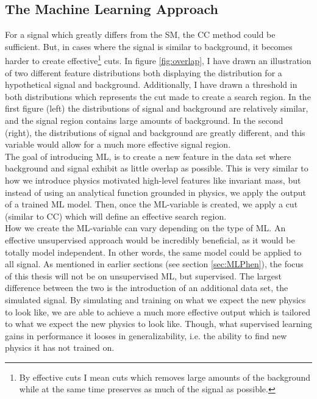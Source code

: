 \subsection{The Machine Learning Approach}
For a signal which greatly differs from the \ac{SM}, the \ac{CC} method could be sufficient. But, in 
cases where the signal is similar to background, it becomes harder to create effective\footnote{By effective
cuts I mean cuts which removes large amounts of the background while at the same time preserves as much of 
the signal as possible.} cuts. In figure \ref{fig:overlap}, I have drawn an illustration of two different feature distributions both 
displaying the distribution for a hypothetical signal and background. Additionally, I have drawn a 
threshold in both distributions which represents the cut made to create a search region. In the first 
figure (left) the distributions of signal and background are relatively similar, and the signal region 
contains large amounts of background. In the second (right), the distributions of signal and background 
are greatly different, and this variable would allow for a much more effective signal region. 
\\
The goal of introducing \ac{ML}, is to create a new feature in the data set where background and signal
exhibit as little overlap as possible. This is very similar to how we introduce physics motivated high-level
features like invariant mass, but instead of using an analytical function grounded in physics, 
we apply the output of a trained \ac{ML} model. Then, once the \ac{ML}-variable is created, 
we apply a cut (similar to \ac{CC}) which will define an effective search region. 
\\
How we create the \ac{ML}-variable can vary depending on the type of \ac{ML}. An effective unsupervised approach
would be incredibly beneficial, as it would be totally model independent. In other words, the same model could be applied 
to all signal. As mentioned in earlier sections (see section \ref{sec:MLPhen}), the focus of this thesis will not be on 
unsupervised \ac{ML}, but supervised. The largest difference between the two is the introduction of an additional data set,
the simulated signal. By simulating and training on what we expect the new physics to look like, we are able to achieve a much more 
effective output which is tailored to what we expect the new physics to look like. Though, what supervised learning gains in performance
it looses in generalizability, i.e. the ability to find new physics it has not trained on.